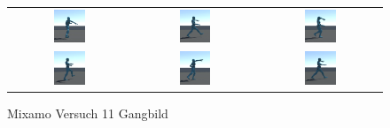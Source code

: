 \begin{figure}[H]
  \centering
  \begin{tabular}{ccc}
    \includegraphics[width=0.27\textwidth]{img/mixamo_laufen1.png} & \includegraphics[width=0.27\textwidth]{img/mixamo_laufen2.png}  & \includegraphics[width=0.27\textwidth]{img/mixamo_laufen3.png} \\
    \includegraphics[width=0.27\textwidth]{img/mixamo_laufen4.png}  & \includegraphics[width=0.27\textwidth]{img/mixamo_laufen5.png}  & \includegraphics[width=0.27\textwidth]{img/mixamo_laufen6.png} \\
  \end{tabular}
  \caption{Mixamo Versuch 11 Gangbild}
  \label{fig:mixamo_versuch11_gangbild}
\end{figure}

